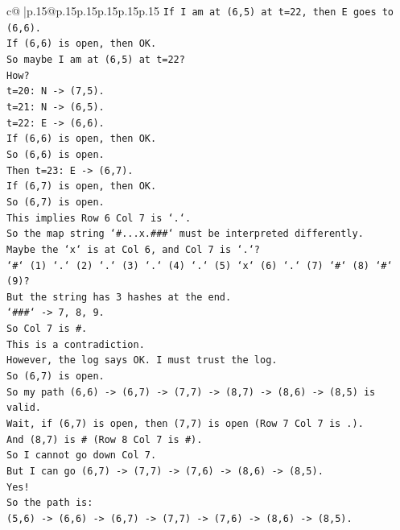 \documentclass{article}
\begin{document}
{\begin{supertabular}{c@{$\;$}|p{.15\linewidth}@{}p{.15\linewidth}p{.15\linewidth}p{.15\linewidth}p{.15\linewidth}p{.15\linewidth}}
{{{\texttt{If I am at (6,5) at t=22, then E goes to (6,6).} \\
\texttt{If (6,6) is open, then OK.} \\
\texttt{So maybe I am at (6,5) at t=22?} \\
\texttt{How?} \\
\texttt{t=20: N {-}> (7,5).} \\
\texttt{t=21: N {-}> (6,5).} \\
\texttt{t=22: E {-}> (6,6).} \\
\texttt{If (6,6) is open, then OK.} \\
\texttt{So (6,6) is open.} \\
\texttt{Then t=23: E {-}> (6,7).} \\
\texttt{If (6,7) is open, then OK.} \\
\texttt{So (6,7) is open.} \\
\texttt{This implies Row 6 Col 7 is `.`.} \\
\texttt{So the map string `\#...x.\#\#\#` must be interpreted differently.} \\
\texttt{Maybe the `x` is at Col 6, and Col 7 is `.`?} \\
\texttt{`\#` (1) `.` (2) `.` (3) `.` (4) `.` (5) `x` (6) `.` (7) `\#` (8) `\#` (9)?} \\
\texttt{But the string has 3 hashes at the end.} \\
\texttt{`\#\#\#` {-}> 7, 8, 9.} \\
\texttt{So Col 7 is \#.} \\
\texttt{This is a contradiction.} \\
\texttt{However, the log says OK. I must trust the log.} \\
\texttt{So (6,7) is open.} \\
\texttt{So my path (6,6) {-}> (6,7) {-}> (7,7) {-}> (8,7) {-}> (8,6) {-}> (8,5) is valid.} \\
\texttt{Wait, if (6,7) is open, then (7,7) is open (Row 7 Col 7 is .).} \\
\texttt{And (8,7) is \# (Row 8 Col 7 is \#).} \\
\texttt{So I cannot go down Col 7.} \\
\texttt{But I can go (6,7) {-}> (7,7) {-}> (7,6) {-}> (8,6) {-}> (8,5).} \\
\texttt{Yes!} \\
\texttt{So the path is:} \\
\texttt{(5,6) {-}> (6,6) {-}> (6,7) {-}> (7,7) {-}> (7,6) {-}> (8,6) {-}> (8,5).} \\
}}}
\end{supertabular}}
\end{document}
